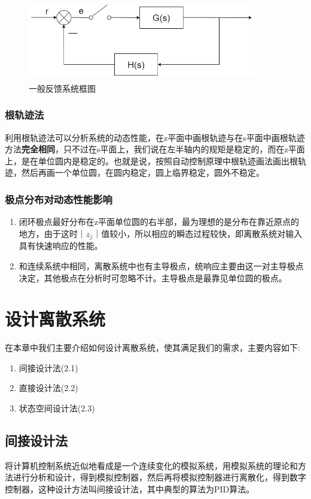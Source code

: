 \documentclass[12pt, a4paper, oneside]{ctexbook}
\begin{document}
\begin{figure}[htbp]
	\centering
	\includegraphics[width=10cm,height=3.5cm]{img/4_1.png}
	\caption{一般反馈系统框图}
\end{figure}
\subsection{根轨迹法} 
利用根轨迹法可以分析系统的动态性能，在z平面中画根轨迹与在s平面中画根轨迹方法\textbf{完全相同}，只不过在s平面上，我们说在左半轴内的规矩是稳定的，而在z平面上，是在单位圆内是稳定的。也就是说，按照自动控制原理中根轨迹画法画出根轨迹，然后再画一个单位圆，在圆内稳定，圆上临界稳定，圆外不稳定。

\subsection{极点分布对动态性能影响} 
\begin{enumerate} 
	\item 闭环极点最好分布在z平面单位圆的右半部，最为理想的是分布在靠近原点的地方，由于这时$｜z_j｜$值较小，所以相应的瞬态过程较快，即离散系统对输入具有快速响应的性能。
	\item 和连续系统中相同，离散系统中也有主导极点，统响应主要由这一对主导极点决定，其他极点在分析时可忽略不计。主导极点是最靠见单位圆的极点。
\end{enumerate}
\newpage
\chapter{设计离散系统}
在本章中我们主要介绍如何设计离散系统，使其满足我们的需求，主要内容如下:
\begin{enumerate} 
	\item 间接设计法(2.1)
	\item 直接设计法(2.2)
	\item 状态空间设计法(2.3)
\end{enumerate}
\newpage
\section{间接设计法}
将计算机控制系统近似地看成是一个连续变化的模拟系统，用模拟系统的理论和方法进行分析和设计，得到模拟控制器，然后再将模拟控制器进行离散化，得到数字控制器，这种设计方法叫间接设计法，其中典型的算法为PID算法。
\end{document}

